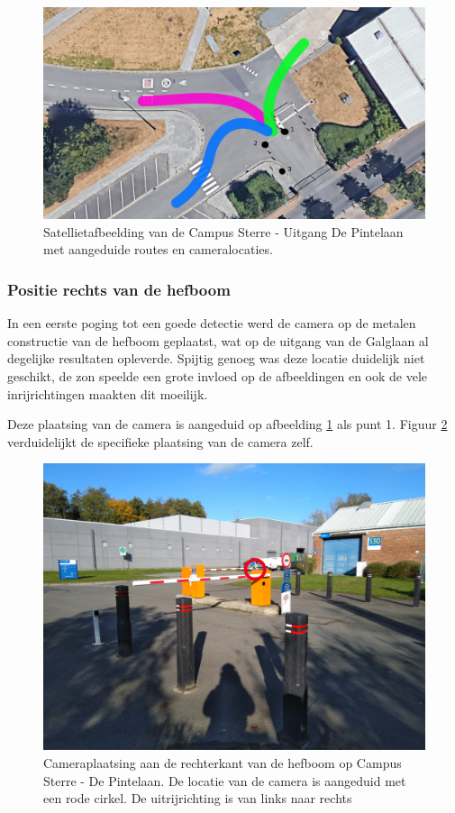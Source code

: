 \begin{figure}[h!]
	\centering
	\includegraphics[width=\linewidth]{img/satellietdepintelaan.png}
	\caption{Satellietafbeelding van de Campus Sterre - Uitgang De Pintelaan met aangeduide routes en cameralocaties. \autocite{ugent2019google}}
	\label{fig:satellietdepintelaan}
\end{figure}

\subsubsection{Positie rechts van de hefboom}
In een eerste poging tot een goede detectie werd de camera op de metalen constructie van de hefboom geplaatst, wat op de uitgang van de Galglaan al degelijke resultaten opleverde. Spijtig genoeg was deze locatie duidelijk niet geschikt, de zon speelde een grote invloed op de afbeeldingen en ook de vele inrijrichtingen maakten dit moeilijk.

Deze plaatsing van de camera is aangeduid op afbeelding \ref{fig:satellietdepintelaan} als punt 1. Figuur \ref{fig:plaatsingdepintelaanorigineel} verduidelijkt de specifieke plaatsing van de camera zelf.

\begin{figure}[h!]
	\centering
	\includegraphics[width=0.8\linewidth]{img/depintelaanorigineel.jpg}
	\caption{Cameraplaatsing aan de rechterkant van de hefboom op Campus Sterre - De Pintelaan. De locatie van de camera is aangeduid met een rode cirkel. De uitrijrichting is van links naar rechts}
	\label{fig:plaatsingdepintelaanorigineel}
\end{figure}

